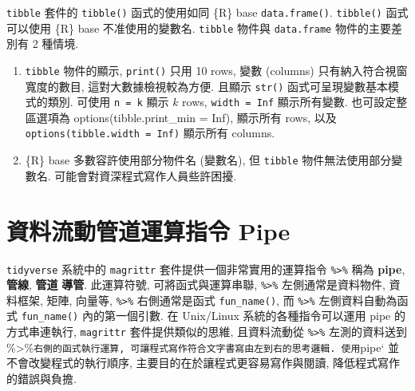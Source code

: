 \documentclass[
]{book}
\begin{document}
\texttt{tibble} 套件的 \texttt{tibble()} 函式的使用如同 \{R\} base \texttt{data.frame()}.
\texttt{tibble()} 函式可以使用 \{R\} base 不准使用的變數名.
\texttt{tibble} 物件與 \texttt{data.frame} 物件的主要差別有 2 種情境.

\begin{enumerate}
\def\labelenumi{\arabic{enumi}.}
\item
  \texttt{tibble} 物件的顯示, \texttt{print()} 只用 10 rows, 變數 (columns) 只有納入符合視窗寬度的數目, 這對大數據檢視較為方便.
  且顯示 \texttt{str()} 函式可呈現變數基本模式的類別.
  可使用 \texttt{n\ =\ k} 顯示 \(k\) rows,
  \texttt{width\ =\ Inf} 顯示所有變數.
  也可設定整區選項為
  options(tibble.print\_min = Inf), 顯示所有 rows,
  以及
  \texttt{options(tibble.width\ =\ Inf)} 顯示所有 columns.
\item
  \{R\} base 多數容許使用部分物件名 (變數名),
  但 \texttt{tibble} 物件無法使用部分變數名.
  可能會對資深程式寫作人員些許困擾.
\end{enumerate}

\hypertarget{ux8cc7ux6599ux6d41ux52d5ux7ba1ux9053ux904bux7b97ux6307ux4ee4-pipe}{%
\section{資料流動管道運算指令 Pipe}\label{ux8cc7ux6599ux6d41ux52d5ux7ba1ux9053ux904bux7b97ux6307ux4ee4-pipe}}

\texttt{tidyverse} 系統中的 \texttt{magrittr} 套件提供一個非常實用的運算指令
\texttt{\%\textgreater{}\%} 稱為 \textbf{pipe}, \textbf{管線}, \textbf{管道} \textbf{導管}.
此運算符號, 可將函式與運算串聯,
\texttt{\%\textgreater{}\%} 左側通常是資料物件, 資料框架, 矩陣, 向量等,
\texttt{\%\textgreater{}\%} 右側通常是函式 \texttt{fun\_name()},
而 \texttt{\%\textgreater{}\%} 左側資料自動為函式 \texttt{fun\_name()} 內的第一個引數.
在 Unix/Linux 系統的各種指令可以運用 pipe 的方式串連執行,
\texttt{magrittr} 套件提供類似的思維,
且資料流動從 \texttt{\%\textgreater{}\%} 左測的資料送到 \%\textgreater\%\texttt{右側的函式執行運算,\ 可讓程式寫作符合文字書寫由左到右的思考邏輯.\ 使用}pipe` 並不會改變程式的執行順序,
主要目的在於讓程式更容易寫作與閱讀,
降低程式寫作的錯誤與負擔.
\end{document}
